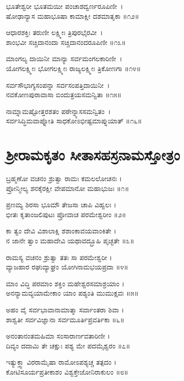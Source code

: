 ಭೂತೇಶ್ವರೀ ಭೂತಮಯೀ ಪಂಚಾಶದ್ವರ್ಣರೂಪಿಣೀ~।\\
ಷೋಢಾನ್ಯಾಸ ಮಹಾಭೂಷಾ ಕಾಮಾಕ್ಷೀ ದಶಮಾತೃಕಾ ॥೧೨॥

ಆಧಾರಶಕ್ತಿಃ ತರುಣೀ ಲಕ್ಷ್ಮೀಃ ತ್ರಿಪುರಭೈರವೀ~।\\
ಶಾಂಭವೀ ಸಚ್ಚಿದಾನಂದಾ ಸಚ್ಚಿದಾನಂದರೂಪಿಣೀ ॥೧೩॥

ಮಾಂಗಲ್ಯ ದಾಯಿನೀ ಮಾನ್ಯಾ ಸರ್ವಮಂಗಲಕಾರಿಣೀ~।\\
ಯೋಗಲಕ್ಷ್ಮೀಃ ಭೋಗಲಕ್ಷ್ಮೀಃ ರಾಜ್ಯಲಕ್ಷ್ಮೀಃ ತ್ರಿಕೋಣಗಾ ॥೧೪॥

ಸರ್ವಸೌಭಾಗ್ಯಸಂಪನ್ನಾ ಸರ್ವಸಂಪತ್ತಿದಾಯಿನೀ~।\\
ನವಕೋಣಪುರಾವಾಸಾ ಬಿಂದುತ್ರಯಸಮನ್ವಿತಾ ॥೧೫॥

ನಾಮ್ನಾಮಷ್ಟೋತ್ತರಶತಂ ಪಠೇನ್ನ್ಯಾಸಸಮನ್ವಿತಂ~।\\
ಸರ್ವಸಿದ್ಧಿಮವಾಪ್ನೋತಿ ಸಾಧಕೋಽಭೀಷ್ಟಮಾಪ್ನುಯಾತ್ ॥೧೬॥

\section{ಶ್ರೀರಾಮಕೃತಂ ಸೀತಾಸಹಸ್ರನಾಮಸ್ತೋತ್ರಂ }
ಬ್ರಹ್ಮಣೋ ವಚನಂ ಶ್ರುತ್ವಾ ರಾಮಃ ಕಮಲಲೋಚನಃ ।\\
ಪ್ರೋನ್ಮೀಲ್ಯ ಶನಕೈರಕ್ಷೀ ವೇಪಮಾನೋ ಮಹಾಭುಜಃ ॥೧॥

ಪ್ರಣಮ್ಯ ಶಿರಸಾ ಭೂಮೌ ತೇಜಸಾ ಚಾಪಿ ವಿಹ್ವಲಃ ।\\
ಭೀತಃ ಕೃತಾಂಜಲಿಪುಟಃ ಪ್ರೋವಾಚ ಪರಮೇಶ್ವರೀಂ ॥೨॥

ಕಾ ತ್ವಂ ದೇವಿ ವಿಶಾಲಾಕ್ಷಿ ಶಶಾಂಕಾವಯವಾಂಕಿತೇ ।\\
ನ ಜಾನೇ ತ್ವಾಂ ಮಹಾದೇವಿ ಯಥಾವದ್ಬ್ರೂಹಿ ಪೃಚ್ಛತೇ ॥೩॥

ರಾಮಸ್ಯ ವಚನಂ ಶ್ರುತ್ವಾ ತತಃ ಸಾ ಪರಮೇಶ್ವರೀ ।\\
ವ್ಯಾಜಹಾರ ರಘುವ್ಯಾಘ್ರಂ ಯೋಗಿನಾಮಭಯಪ್ರದಾ ॥೪॥

ಮಾಂ ವಿದ್ಧಿ ಪರಮಾಂ ಶಕ್ತಿಂ ಮಹೇಶ್ವರಸಮಾಶ್ರಯಾಂ ।\\
ಅನನ್ಯಾಮವ್ಯಯಾಮೇಕಾಂ ಯಾಂ ಪಶ್ಯಂತಿ ಮುಮುಕ್ಷವಃ ॥೫॥

ಅಹಂ ವೈ ಸರ್ವಭಾವಾನಾಮಾತ್ಮಾ ಸರ್ವಾಂತರಾ ಶಿವಾ ।\\
ಶಾಶ್ವತೀ ಸರ್ವವಿಜ್ಞಾನಾ ಸರ್ವಮೂರ್ತಿಪ್ರವರ್ತಿಕಾ ॥೬॥

ಅನಂತಾನಂತಮಹಿಮಾ ಸಂಸಾರಾರ್ಣವತಾರಿಣೀ ।\\
ದಿವ್ಯಂ ದದಾಮಿ ತೇ ಚಕ್ಷುಃ ಪಶ್ಯ ಮೇ ಪದಮೈಶ್ವರಂ ॥೭॥

ಇತ್ಯುಕ್ತ್ವಾ ವಿರರಾಮೈಷಾ ರಾಮೋಽಪಶ್ಯಚ್ಚ ತತ್ಪದಂ ।\\
ಕೋಟಿಸೂರ್ಯಪ್ರತೀಕಾಶಂ ವಿಶ್ವಕ್ತೇಜೋನಿರಾಕುಲಂ ॥೮॥

